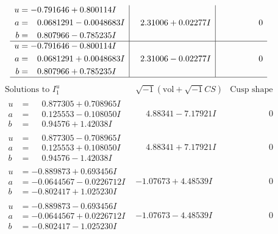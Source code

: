 \documentclass[1p]{elsarticle_modified}
\theoremstyle{definition}
\newcommand{\I}{\sqrt{-1}}
\begin{document}
$$\begin{array}{c|c|c}
\begin{aligned}
u &= -0.791646 + 0.800114 I \\
a &= \phantom{-}0.0681291 - 0.0048683 I \\
b &= \phantom{-}0.807966 - 0.785235 I\end{aligned}
 & \phantom{-}2.31006 + 0.02277 I & \phantom{-0.000000 } 0 \\ \hline\begin{aligned}
u &= -0.791646 - 0.800114 I \\
a &= \phantom{-}0.0681291 + 0.0048683 I \\
b &= \phantom{-}0.807966 + 0.785235 I\end{aligned}
 & \phantom{-}2.31006 - 0.02277 I & \phantom{-0.000000 } 0\\
 \hline 
 \end{array}$$\newpage$$\begin{array}{c|c|c}  
\text{Solutions to }I^u_{1}& \I (\text{vol} + \sqrt{-1}CS) & \text{Cusp shape}\\
 \hline 
\begin{aligned}
u &= \phantom{-}0.877305 + 0.708965 I \\
a &= \phantom{-}0.125553 - 0.108050 I \\
b &= \phantom{-}0.94576 + 1.42038 I\end{aligned}
 & \phantom{-}4.88341 - 7.17921 I & \phantom{-0.000000 } 0 \\ \hline\begin{aligned}
u &= \phantom{-}0.877305 - 0.708965 I \\
a &= \phantom{-}0.125553 + 0.108050 I \\
b &= \phantom{-}0.94576 - 1.42038 I\end{aligned}
 & \phantom{-}4.88341 + 7.17921 I & \phantom{-0.000000 } 0 \\ \hline\begin{aligned}
u &= -0.889873 + 0.693456 I \\
a &= -0.0644567 - 0.0226712 I \\
b &= -0.802417 + 1.025230 I\end{aligned}
 & -1.07673 + 4.48539 I & \phantom{-0.000000 } 0 \\ \hline\begin{aligned}
u &= -0.889873 - 0.693456 I \\
a &= -0.0644567 + 0.0226712 I \\
b &= -0.802417 - 1.025230 I\end{aligned}
 & -1.07673 - 4.48539 I & \phantom{-0.000000 } 0 \\ \hline\begin{aligned}

\end{aligned}
\end{array}$$
\end{document}
